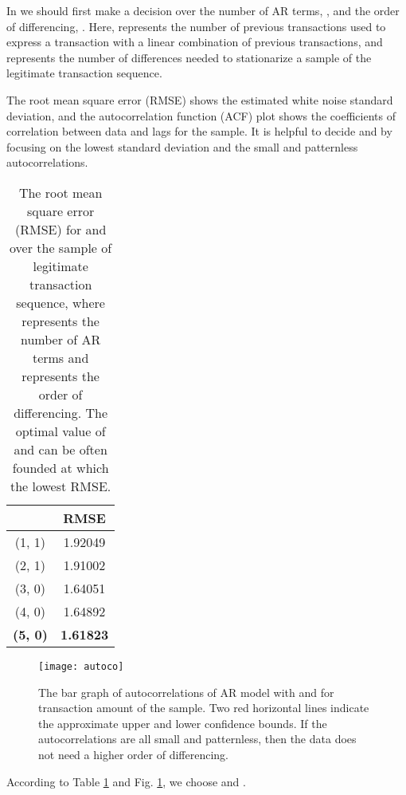 \documentclass[final,authoryear,5p,times,twocolumn]{elsarticle}
\begin{document}
In  we should first make a decision over the number of AR terms, , and the order of differencing, . Here,  represents the number of previous transactions used to express a transaction with a linear combination of previous transactions, and  represents the number of differences needed to stationarize a sample of the legitimate transaction sequence.

The root mean square error (RMSE) shows the estimated white noise standard deviation, and the autocorrelation function (ACF) plot shows the coefficients of correlation between data and lags for the sample. It is helpful to decide  and  by focusing on the lowest standard deviation and the small and patternless autocorrelations.

\begin{table}[h]
\begin{center}
    \begin{tabular}{|c|c|}
    \hline
     & RMSE    \\ \hline
    (1, 1) & 1.92049 \\ 
    (2, 1) & 1.91002 \\ 
    (3, 0) & 1.64051 \\ 
    (4, 0) & 1.64892 \\ 
    \textbf{(5, 0)} & \textbf{1.61823} \\ \hline
    \end{tabular}
    \caption {The root mean square error (RMSE) for  and  over the sample of legitimate transaction sequence, where  represents the number of AR terms and  represents the order of differencing. The optimal value of  and  can be often founded at which the lowest RMSE.}
    \label{tab:rmse}
\end{center}
\end{table}


\begin{figure}[h!]
\centering
\texttt{[image: autoco]}
\caption{The bar graph of autocorrelations of AR model with  and  for transaction amount of the sample. Two red horizontal lines indicate the approximate upper and lower confidence bounds. If the autocorrelations are all small and patternless, then the data does not need a higher order of differencing.}
\label{fig:autocorrelation}
\end{figure}

According to Table \ref{tab:rmse} and Fig. \ref{fig:autocorrelation}, we choose  and .
\end{document}
